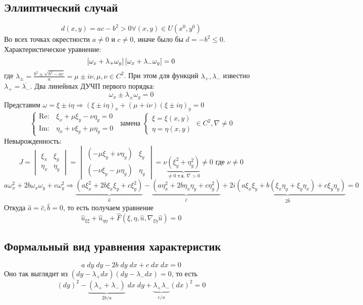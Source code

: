 \subsection{Эллиптический случай}
$$
d(x, y) = ac - b^2 > 0 \forall (x, y) \in U(x^0, y^0)
$$
Во всех точках окрестности $a\ne 0$ и $c\ne 0$, иначе было бы $d = -b^2 \leq 0$. Характеристическое уравнение:
$$
\left[\omega_x + \lambda_+\omega_y\right]\left[\omega_x + \lambda_-\omega_y\right] = 0
$$
где $\lambda_\pm = \frac{b^2\pm\sqrt{b^2 - ac}}{a} = \mu \pm i\nu, \mu, \nu \in C^2$. При этом для функций $\lambda_+, \lambda_-$ известно $\lambda_+ = \overline{\lambda_-}$. Два линейных ДУЧП первого порядка:
$$
\omega_x \pm \lambda_\pm\omega_y = 0
$$
Представим $\omega = \xi \pm i\eta \Rightarrow
(\xi \pm i\eta)_x + (\mu + i\nu)(\xi \pm i\eta)_y = 0$
$$
\begin{cases}
    \mathrm{Re:} & \xi_x + \mu\xi_y - \nu\eta_y = 0\\
    \mathrm{Im:} & \eta_x + \nu\xi_y + \mu\eta_y = 0
\end{cases}\;\;\text{замена }
\begin{cases}
    \xi = \xi(x, y) \\
    \eta = \eta(x, y)
\end{cases} \in C^2, \nabla \ne 0
$$
Невырожденность:
$$ J = 
\begin{vmatrix}
    \xi_x & \xi_y \\
    \eta_x & \eta_y
\end{vmatrix} =
\begin{vmatrix}
    (-\mu\xi_y + \nu\eta_y) & \xi_y \\
    (-\nu\xi_y - \mu\eta_y) & \eta_y
\end{vmatrix} =
\nu\underbrace{(\xi_y^2 + \eta_y^2)}_{\ne 0 \text{ т.к. }\nabla > 0} \ne 0 \text{ где }\nu \ne 0
$$
$$
a\omega_x^2 + 2b\omega_x\omega_y + c\omega_y^2 \Rightarrow 
\underbrace{(a\xi^2_x + 2b\xi_x\xi_y + c\xi_y^2)}_{\hat a} -
\underbrace{(a\eta_x^2 + 2b\eta_x\eta_y + c\eta_y^2)}_{\hat c}+ 
\underbrace{2i(a\xi_x\xi_y + b(\xi_x\eta_y + \xi_y\eta_x) + c\xi_y\eta_y)}_{2\hat b} = 0
$$
Откуда $\hat a = \hat c, \hat b = 0$, то есть получаем уравнение
$$
\hat u_{\xi\xi} + \hat u_{\eta\eta} + \hat F(\xi, \eta, \hat u, \nabla_{\xi\eta}\hat u) = 0
$$
\subsection{Формальный вид уравнения характеристик}
$$
a\;dy\;dy - 2b\;dy\;dx + c\;dx\;dx =0
$$
Оно так выглядит из $(dy - \lambda_+dx)(dy - \lambda_-dx)=0$, то есть 
$$
(dy)^2 - \underbrace{(\lambda_+ + \lambda_-)}_{2b/a}\;dx\;dy + \underbrace{\lambda_+\lambda_-}_{c/a}(dx)^2 = 0
$$
